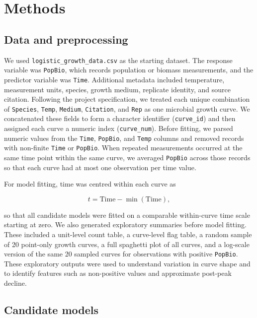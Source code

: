 \documentclass[11pt]{article}
\begin{document}
\section{Methods}

\subsection{Data and preprocessing}

We used \texttt{logistic\_growth\_data.csv} as the starting dataset. The response variable was \texttt{PopBio}, which records population or biomass measurements, and the predictor variable was \texttt{Time}. Additional metadata included temperature, measurement units, species, growth medium, replicate identity, and source citation. Following the project specification, we treated each unique combination of \texttt{Species}, \texttt{Temp}, \texttt{Medium}, \texttt{Citation}, and \texttt{Rep} as one microbial growth curve. We concatenated these fields to form a character identifier (\texttt{curve\_id}) and then assigned each curve a numeric index (\texttt{curve\_num}). Before fitting, we parsed numeric values from the \texttt{Time}, \texttt{PopBio}, and \texttt{Temp} columns and removed records with non-finite \texttt{Time} or \texttt{PopBio}. When repeated measurements occurred at the same time point within the same curve, we averaged \texttt{PopBio} across those records so that each curve had at most one observation per time value.

For model fitting, time was centred within each curve as

\begin{equation}
t = \mathrm{Time} - \min(\mathrm{Time}),
\label{eq:tcenter}
\end{equation}

so that all candidate models were fitted on a comparable within-curve time scale starting at zero. We also generated exploratory summaries before model fitting. These included a unit-level count table, a curve-level flag table, a random sample of 20 point-only growth curves, a full spaghetti plot of all curves, and a log-scale version of the same 20 sampled curves for observations with positive \texttt{PopBio}. These exploratory outputs were used to understand variation in curve shape and to identify features such as non-positive values and approximate post-peak decline.

\subsection{Candidate models}
\end{document}
